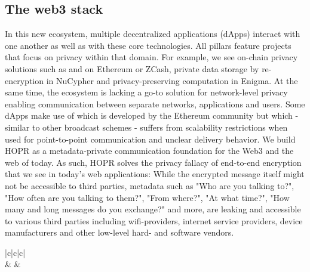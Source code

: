 \subsection{The web3 stack}
In this new ecosystem, multiple decentralized applications (dApps) interact with one another as well as with these core technologies. All pillars feature projects that focus on privacy within that domain. For example, we see on-chain privacy solutions such as  and  on Ethereum or ZCash, private data storage by re-encryption in NuCypher and privacy-preserving computation in Enigma. At the same time, the ecosystem is lacking a go-to solution for network-level privacy enabling communication between separate networks, applications and users. Some dApps make use of  which is developed by the Ethereum community but which - similar to other broadcast schemes - suffers from scalability restrictions when used for point-to-point communication and unclear delivery behavior. We build HOPR as a metadata-private communication foundation for the Web3 and the web of today. As such, HOPR solves the privacy fallacy of end-to-end encryption that we see in today's web applications: While the encrypted  message itself might not be accessible to third parties, metadata such as "Who are you talking to?", "How often are you talking to them?", "From where?", "At what time?", "How many and long messages do you exchange?" and more, are leaking and accessible to various third parties including wifi-providers, internet service providers, device manufacturers and other low-level hard- and software vendors.

\setlength{\tabcolsep}{1em} %
{\renewcommand{\arraystretch}{2}%
    \begin{center}
        \begin{tabular}{|c|c|c|}
            \hline
                          \\
            \hline
             &  & \\
            \hline
             \\
            \hline
        \end{tabular}
    \end{center}
}

